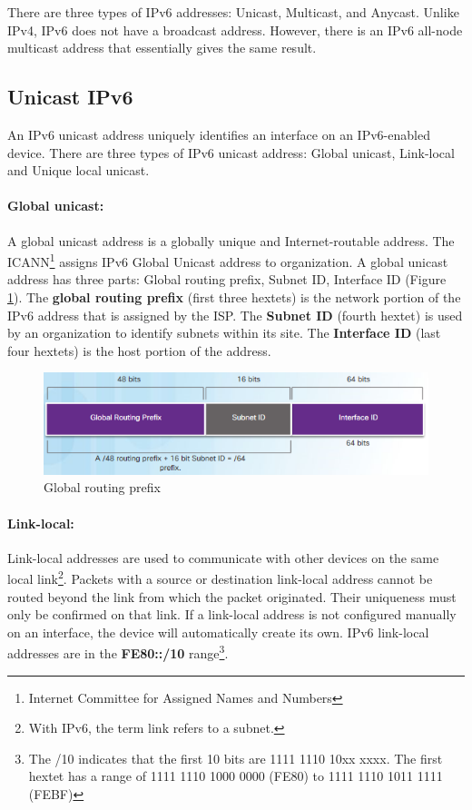 There are three types of IPv6 addresses: Unicast, Multicast, and Anycast. Unlike IPv4, IPv6 does not have a broadcast address. However, there is an IPv6 all-node multicast address that essentially gives the same result.

\subsection{Unicast IPv6}

An IPv6 unicast address uniquely identifies an interface on an IPv6-enabled device. There are three types of IPv6 unicast address: Global unicast, Link-local and Unique local unicast.

\paragraph{Global unicast:} A global unicast address  is a globally unique and Internet-routable address. The ICANN\footnote{Internet Committee for Assigned Names and Numbers} assigns IPv6 Global Unicast address to organization. A global unicast address has three parts: Global routing prefix, Subnet ID, Interface ID (Figure \ref{GUA}). The \textbf{global routing prefix} (first three hextets) is the network portion of the IPv6 address that is assigned by the ISP. The \textbf{Subnet ID} (fourth hextet) is used by an organization to identify subnets within its site. The \textbf{Interface ID} (last four hextets) is the host portion of the address.

\begin{figure}[hbtp]
\caption{Global routing prefix}\label{GUA}
\centering
\includegraphics[scale=0.6]{pictures/GUA.PNG}
\end{figure}


\paragraph{Link-local:} Link-local addresses are used to communicate with other devices on the same local link\footnote{With IPv6, the term link refers to a subnet.}. Packets with a source or destination link-local address cannot be routed beyond the link from which the packet originated. Their uniqueness must only be confirmed on that link. If a link-local address is not configured manually on an interface, the device will automatically create its own. IPv6 link-local addresses are in the \textbf{FE80::/10} range\footnote{The /10 indicates that the first 10 bits are 1111 1110 10xx xxxx. The first hextet has a range of 1111 1110 1000 0000 (FE80) to 1111 1110 1011 1111 (FEBF)}.

